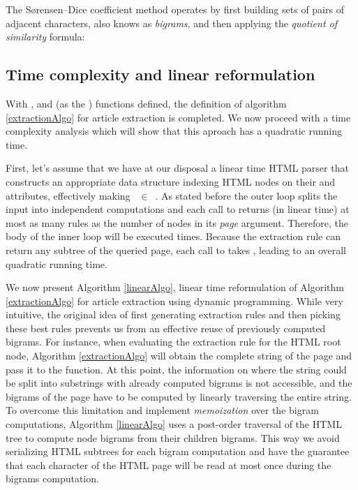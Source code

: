 \similarityTable

The Sørensen–Dice coefficient method operates by first building sets of pairs of adjacent characters, also knows as \emph{bigrams}, and then applying the \emph{quotient of similarity} formula:

\similarityAlgo


\subsection{Time complexity and linear reformulation}
\label{timecomplexityandlinearreformulation}

With ,  and  (as the ) functions defined, the definition of algorithm \ref{extractionAlgo} for article extraction is completed. We now proceed with a time complexity analysis which will show that this aproach has a quadratic running time.

First, let's assume that we have at our disposal a linear time HTML parser that constructs an appropriate data structure indexing HTML nodes on their  and  attributes, effectively making ~$\in$~. As stated before the outer loop splits the input into independent computations and each call to  returns (in linear time) at most as many rules as the number of nodes in its \emph{page} argument. Therefore, the body of the inner loop will be executed  times. Because the extraction rule can return any subtree of the queried page, each call to  takes , leading to an overall quadratic running time.

We now present Algorithm \ref{linearAlgo}, linear time reformulation of Algorithm \ref{extractionAlgo} for article extraction using dynamic programming. While very intuitive, the original idea of first generating extraction rules and then picking these best rules prevents us from an effective reuse of previously computed bigrams. For instance, when evaluating the extraction rule for the HTML root node, Algorithm \ref{extractionAlgo} will obtain the complete string of the page and pass it to the  function. At this point, the information on where the string could be split into substrings with already computed bigrams is not accessible, and the bigrams of the page have to be computed by linearly traversing the entire string. To overcome this limitation and implement \emph{memoization} over the bigram computations, Algorithm \ref{linearAlgo} uses a post-order traversal of the HTML tree to compute node bigrams from their children bigrams. This way we avoid serializing HTML subtrees for each bigram computation and have the guarantee that each character of the HTML page will be read at most once during the bigrams computation.

